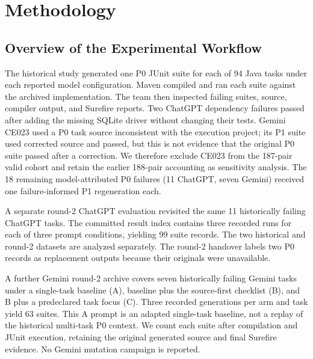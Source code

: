 \section{Methodology}
\label{sec:methodology}

\subsection{Overview of the Experimental Workflow}
\label{subsec:workflow}
The historical study generated one P0 JUnit suite for each of 94 Java tasks under each reported model configuration. Maven compiled and ran each suite against the archived implementation. The team then inspected failing suites, source, compiler output, and Surefire reports. Two ChatGPT dependency failures passed after adding the missing SQLite driver without changing their tests. Gemini CE023 used a P0 task source inconsistent with the execution project; its P1 suite used corrected source and passed, but this is not evidence that the original P0 suite passed after a correction. We therefore exclude CE023 from the 187-pair valid cohort and retain the earlier 188-pair accounting as sensitivity analysis. The 18 remaining model-attributed P0 failures (11 ChatGPT, seven Gemini) received one failure-informed P1 regeneration each.

A separate round-2 ChatGPT evaluation revisited the same 11 historically failing ChatGPT tasks. The committed result index contains three recorded runs for each of three prompt conditions, yielding 99 suite records. The two historical and round-2 datasets are analyzed separately. The round-2 handover labels two P0 records as replacement outputs because their originals were unavailable.

A further Gemini round-2 archive covers seven historically failing Gemini tasks under a single-task baseline (A), baseline plus the source-first checklist (B), and B plus a predeclared task focus (C). Three recorded generations per arm and task yield 63 suites. This A prompt is an adapted single-task baseline, not a replay of the historical multi-task P0 context. We count each suite after compilation and JUnit execution, retaining the original generated source and final Surefire evidence. No Gemini mutation campaign is reported.

